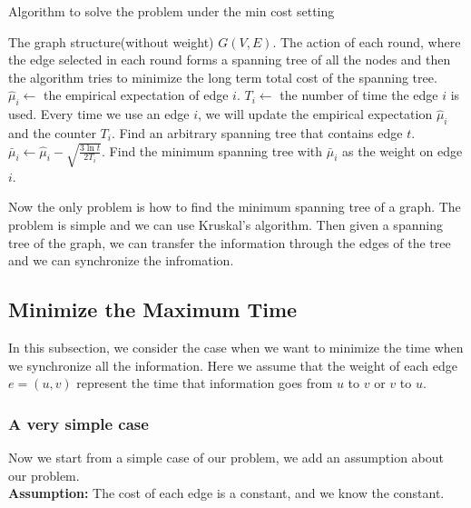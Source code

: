 \documentclass{article}
\theoremstyle{plain}
\theoremstyle{definition}
\theoremstyle{remark}
\begin{document}
    \begin{algorithm}
        \caption{Algorithm to solve the problem under the min cost setting}
        \label{cucbmintree}
        \begin{algorithmic}[1]
        \Require The graph structure(without weight) $G(V,E)$.
        \Ensure The action of each round, where the edge selected in each round forms a spanning tree of all the nodes and then the algorithm tries to minimize the long term total cost of the spanning tree.
            \State $\hat \mu_i \leftarrow$ the empirical expectation of edge $i$.
            \State $T_i \leftarrow$ the number of time the edge $i$ is used.
            \State Every time we use an edge $i$, we will update the empirical expectation $\hat \mu_i$ and the counter $T_i$.
                \State Find an arbitrary spanning tree that contains edge $t$.
            \EndFor
                \State $\bar\mu_i \leftarrow \hat\mu_i - \sqrt{\frac{3\ln t}{2T_i}}$.
                \State Find the minimum spanning tree with $\bar\mu_i$ as the weight on edge $i$.
            \EndFor
        \EndProcedure
        \end{algorithmic}
    \end{algorithm}

    Now the only problem is how to find the minimum spanning tree of a graph. The problem is simple and we can use Kruskal's algorithm. Then given a spanning tree of the graph, we can transfer the information through the edges of the tree and we can synchronize the infromation.

    \subsection{Minimize the Maximum Time}
    In this subsection, we consider the case when we want to minimize the time when we synchronize all the information. Here we assume that the weight of each edge $e = (u,v)$ represent the time that information goes from $u$ to $v$ or $v$ to $u$.

    \subsubsection{A very simple case}
    Now we start from a simple case of our problem, we add an assumption about our problem.\\
    
    \textbf{Assumption:} The cost of each edge is a constant, and we know the constant.\\
    
\end{document}
